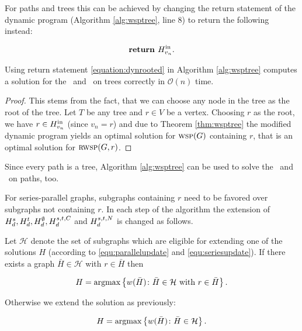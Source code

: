 For paths and trees this can be achieved by changing the return statement of the dynamic program (Algorithm \ref{alg:wsptree}, line $8$) to return the following instead:

\begin{align}
	\label{equation:dynrooted}
	\textbf{return } H_{v_n}^{\text{in}}.
\end{align}

\begin{theorem}
	Using return statement \eqref{equation:dynrooted} in Algorithm \ref{alg:wsptree} computes a solution for the \RWSP\ and \RWISP\ on trees correctly in $\mathcal{O}(n)$ time.
\end{theorem}
\begin{proof} 
	This stems from the fact, that we can choose any node in the tree as the root of the tree. Let $T$ be any tree and $r \in V$ be a vertex. Choosing $r$ as the root, we have $r \in H_{v_n}^{\text{in}}$ (since $v_n=r$) and due to Theorem \ref{thm:wsptree} the modified dynamic program yields an optimal solution for $\textsc{wsp}(G)$ containing $r$, that is an optimal solution for $\textsc{rwsp}(G, r)$.
\end{proof}

Since every path is a tree, Algorithm \ref{alg:wsptree} can be used to solve the \RWSP\ and \RWISP\ on paths, too.\medskip

For series-parallel graphs, subgraphs containing $r$ need to be favored over subgraphs not containing $r$. In each step of the algorithm the extension of $H_{d}^{s}, H_{d}^{t}, H_{d}^{\emptyset}, H_{d}^{s,t,C}$ and $H_{d}^{s,t,N}$ is changed as follows.\medskip

Let $\mathcal{H}$ denote the set of subgraphs which are eligible for extending one of the solutions $H$ (according to \eqref{equ:parallelupdate} and \eqref{equ:seriesupdate}). If there exists a graph $\bar{H} \in \mathcal{H}$ with $r \in \bar{H}$ then

\begin{equation}
	\label{equation:rwsp:update}
	H = \operatorname*{argmax} \left\{ w(\bar{H}) \colon \bar{H} \in \mathcal{H} \text{ with } r \in \bar{H} \right\}.
\end{equation}

Otherwise we extend the solution as previously:

\begin{equation}
	\label{equation:rwsp:update2}
	H = \operatorname*{argmax} \left\{ w(\bar{H}) \colon \bar{H} \in \mathcal{H} \right\}.
\end{equation}

